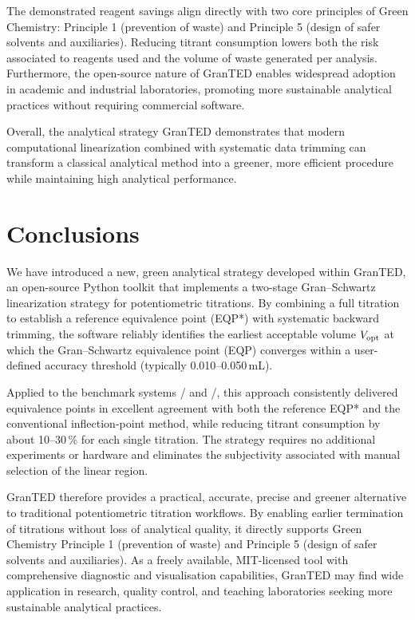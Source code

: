 \documentclass[twoside,twocolumn,9pt]{article}
\begin{document}
The demonstrated reagent savings align directly with two core principles of Green Chemistry: Principle 1 (prevention of waste) and Principle 5 (design of safer solvents and auxiliaries).
Reducing titrant consumption lowers both the risk associated to reagents used and the volume of waste generated per analysis.
Furthermore, the open-source nature of \textsf{GranTED} enables widespread adoption in academic and industrial laboratories, promoting more sustainable analytical practices without requiring commercial software.

Overall, the analytical strategy \textsf{GranTED} demonstrates that modern computational linearization combined with systematic data trimming can transform a classical analytical method into a greener, more efficient procedure while maintaining high analytical performance.

\section*{Conclusions}

We have introduced a new, green analytical strategy developed within \textsf{GranTED}, an open-source Python toolkit that implements a two-stage Gran--Schwartz linearization strategy for potentiometric titrations.
By combining a full titration to establish a reference equivalence point (EQP*) with systematic backward trimming, the software reliably identifies the earliest acceptable volume \(V_{\rm opt}\) at which the Gran--Schwartz equivalence point (EQP) converges within a user-defined accuracy threshold (typically 0.010--0.050\,mL). 

Applied to the benchmark systems / and /, this approach consistently delivered equivalence points in excellent agreement with both the reference EQP* and the conventional inflection-point method, while reducing titrant consumption by about 10--30\,\% for each single titration.
The strategy requires no additional experiments or hardware and eliminates the subjectivity associated with manual selection of the linear region.

\textsf{GranTED} therefore provides a practical, accurate, precise and greener alternative to traditional potentiometric titration workflows.
By enabling earlier termination of titrations without loss of analytical quality, it directly supports Green Chemistry Principle 1 (prevention of waste) and Principle 5 (design of safer solvents and auxiliaries).
As a freely available, MIT-licensed tool with comprehensive diagnostic and visualisation capabilities, \textsf{GranTED} may find wide application in research, quality control, and teaching laboratories seeking more sustainable analytical practices.
\end{document}
